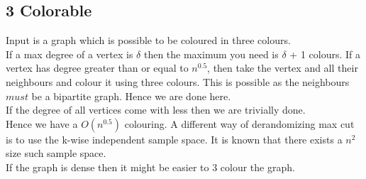\documentclass[solution,addpoints,12pt]{exam}
\begin{document}
\subsection{3 Colorable}
Input is a graph which is possible to be coloured in three
colours.\\

If a max degree of a vertex is $\delta$ then the maximum you need
is $\delta$ + 1 colours. If a vertex has degree greater than or
equal to $n^{0.5}$, then take the vertex and all their neighbours
and colour it using three colours. This is possible
as the neighbours $must$ be a bipartite graph. Hence we are done here.\\
If the degree of all vertices come with less then we are trivially done.\\
Hence we have a $O(n^{0.5})$ colouring.
A different way of derandomizing max cut is to use
the k-wise independent sample space. It is known
that there exists a $n^2$ size such sample space.\\

If the graph is dense then it might be easier to 3 colour
the graph.\\
\end{document}
